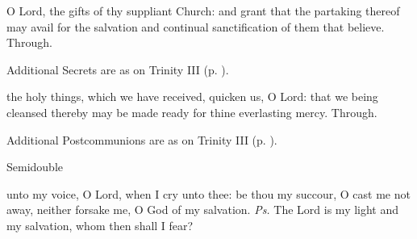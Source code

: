 
\secret
{} O Lord, the gifts of thy suppliant Church: and grant that the partaking thereof may avail for the salvation and continual sanctification of them that believe. Through.
\begin{rubric}
    Additional Secrets are as on Trinity III (p. \pageref{TrinityIII}).
\end{rubric}


\postcommunion
{} the holy things, which we have received, quicken us, O Lord: that we being cleansed thereby may be made ready for thine everlasting mercy. Through.
\begin{rubric}
    Additional Postcommunions are as on Trinity III (p. \pageref{TrinityIII}).
\end{rubric}

\begin{inhead}
    {Semidouble}
\end{inhead}
\par\noindent
{}



\introit
{} unto my voice, O Lord, when I cry unto thee: be thou my succour, O cast me not away, neither forsake me, O God of my salvation. \textit{Ps.} The Lord is my light and my salvation, whom then shall I fear?

